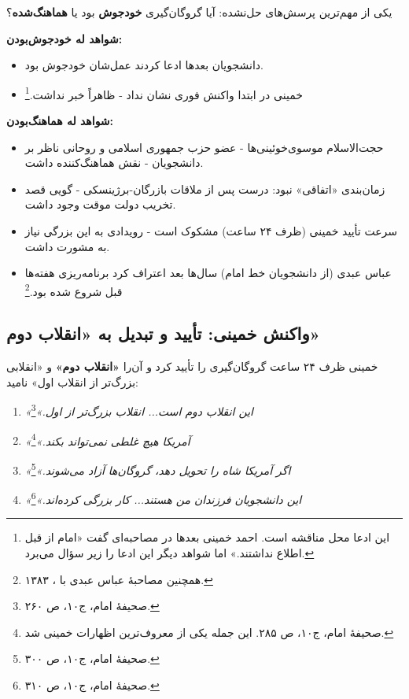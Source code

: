 \documentclass[12pt,a4paper]{book}
\newcommand{\keyword}[1]{\textbf{\textcolor{cPrimary}{#1}}}
\newcommand{\en}[1]{\lr{\textit{#1}}}
\begin{document}
\begin{warningBox}
یکی از مهم‌ترین پرسش‌های حل‌نشده: آیا گروگان‌گیری \keyword{خودجوش} بود یا \keyword{هماهنگ‌شده}؟

\textbf{شواهد له خودجوش‌بودن:}
\begin{itemize}[label=\textcolor{cGreen}{$\checkmark$}]
    \item دانشجویان بعدها ادعا کردند عمل‌شان خودجوش بود.
    \item خمینی در ابتدا واکنش فوری نشان نداد - ظاهراً خبر نداشت.\footnote{این ادعا محل مناقشه است. احمد خمینی بعدها در مصاحبه‌ای گفت «امام از قبل اطلاع نداشتند.» اما شواهد دیگر این ادعا را زیر سؤال می‌برد.}
\end{itemize}

\textbf{شواهد له هماهنگ‌بودن:}
\begin{itemize}[label=\textcolor{cAccent}{$\times$}]
    \item حجت‌الاسلام موسوی‌خوئینی‌ها - عضو حزب جمهوری اسلامی و روحانی ناظر بر دانشجویان - نقش هماهنگ‌کننده داشت.
    \item زمان‌بندی «اتفاقی» نبود: درست پس از ملاقات بازرگان-برژینسکی - گویی قصد تخریب دولت موقت وجود داشت.
    \item سرعت تأیید خمینی (ظرف ۲۴ ساعت) مشکوک است - رویدادی به این بزرگی نیاز به مشورت داشت.
    \item عباس عبدی (از دانشجویان خط امام) سال‌ها بعد اعتراف کرد برنامه‌ریزی هفته‌ها قبل شروع شده بود.\footnote{\en{Bowden (2006), pp.\,40--45;} همچنین مصاحبهٔ عباس عبدی با \en{BBC Persian}، ۱۳۸۳.}
\end{itemize}
\end{warningBox}

\subsection{واکنش خمینی: تأیید و تبدیل به «انقلاب دوم»}

خمینی ظرف ۲۴ ساعت گروگان‌گیری را تأیید کرد و آن‌را \keyword{«انقلاب دوم»} و «انقلابی بزرگ‌تر از انقلاب اول» نامید:

\begin{warningBox}
\begin{enumerate}[label=\textcolor{cAccent}{\bfseries\arabic*.}, rightmargin=2em]
    \item \textit{«این انقلاب دوم است... انقلاب بزرگ‌تر از اول.»}\footnote{صحیفهٔ امام، ج۱۰، ص ۲۶۰.}
    \item \textit{«آمریکا هیچ غلطی نمی‌تواند بکند.»}\footnote{صحیفهٔ امام، ج۱۰، ص ۲۸۵. این جمله یکی از معروف‌ترین اظهارات خمینی شد.}
    \item \textit{«اگر آمریکا شاه را تحویل دهد، گروگان‌ها آزاد می‌شوند.»}\footnote{صحیفهٔ امام، ج۱۰، ص ۳۰۰.}
    \item \textit{«این دانشجویان فرزندان من هستند... کار بزرگی کرده‌اند.»}\footnote{صحیفهٔ امام، ج۱۰، ص ۳۱۰.}
\end{enumerate}
\end{warningBox}
\end{document}
